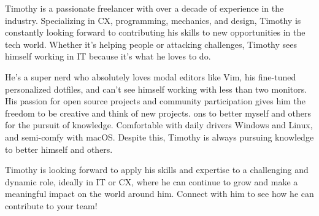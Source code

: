 

\begin{cvparagraph}





Timothy is a passionate freelancer with over a decade of experience in the industry. Specializing in CX, programming, mechanics, and design, Timothy is constantly looking forward to contributing his skills to new opportunities in the tech world. Whether it's helping people or attacking challenges, Timothy sees himself working in IT because it's what he loves to do.

He's a super nerd who absolutely loves modal editors like Vim, his fine-tuned personalized dotfiles, and can't see himself working with less than two monitors. His passion for open source projects and community participation gives him the freedom to be creative and think of new projects. ons to better myself and others for the pursuit of knowledge. Comfortable with daily drivers Windows and Linux, and semi-comfy with macOS. Despite this, Timothy is always pursuing knowledge to better himself and others.

Timothy is looking forward to apply his skills and expertise to a challenging and dynamic role, ideally in IT or CX, where he can continue to grow and make a meaningful impact on the world around him. Connect with him to see how he can contribute to your team!
\end{cvparagraph}
